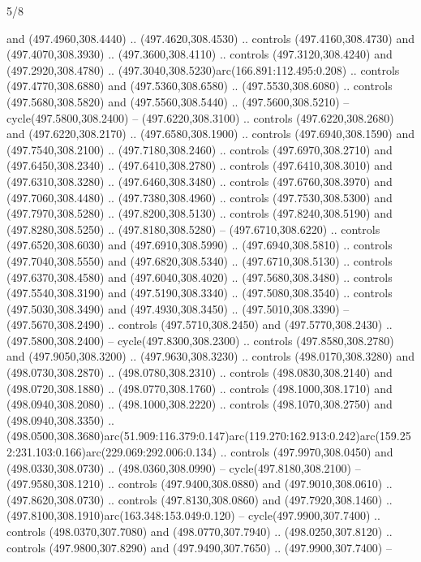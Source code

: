 \begin{flagdescription}{5/8}
\begin{scope}[xshift=0.5\flaglength,yshift=0.5\flagwidth,scale=\flagwidth/475.63]
\begin{scope}[y=0.8pt, x=0.8pt, yscale=-1, xscale=1,shift={(-450,-300)}]
\begin{scope}[cm={{1.0,0.0,0.0,1.0,(-0.0002,0.12556)}},cm={{1.0,0.0,0.0,1.0,(0.00179,0.0)}}]
\begin{scope}[cm={{1.11592,0.0,0.0,1.11592,(-106.89933,-41.77764)}}]
\begin{scope}[draw=black,fill=cfff]
\begin{scope}[fill=black]
  and (497.4960,308.4440) .. (497.4620,308.4530) .. controls (497.4160,308.4730)
  and (497.4070,308.3930) .. (497.3600,308.4110) .. controls (497.3120,308.4240)
  and (497.2920,308.4780) .. (497.3040,308.5230)arc(166.891:112.495:0.208) ..
  controls (497.4770,308.6880) and (497.5360,308.6580) .. (497.5530,308.6080) ..
  controls (497.5680,308.5820) and (497.5560,308.5440) .. (497.5600,308.5210) --
  cycle(497.5800,308.2400) -- (497.6220,308.3100) .. controls
  (497.6220,308.2680) and (497.6220,308.2170) .. (497.6580,308.1900) .. controls
  (497.6940,308.1590) and (497.7540,308.2100) .. (497.7180,308.2460) .. controls
  (497.6970,308.2710) and (497.6450,308.2340) .. (497.6410,308.2780) .. controls
  (497.6410,308.3010) and (497.6310,308.3280) .. (497.6460,308.3480) .. controls
  (497.6760,308.3970) and (497.7060,308.4480) .. (497.7380,308.4960) .. controls
  (497.7530,308.5300) and (497.7970,308.5280) .. (497.8200,308.5130) .. controls
  (497.8240,308.5190) and (497.8280,308.5250) .. (497.8180,308.5280) --
  (497.6710,308.6220) .. controls (497.6520,308.6030) and (497.6910,308.5990) ..
  (497.6940,308.5810) .. controls (497.7040,308.5550) and (497.6820,308.5340) ..
  (497.6710,308.5130) .. controls (497.6370,308.4580) and (497.6040,308.4020) ..
  (497.5680,308.3480) .. controls (497.5540,308.3190) and (497.5190,308.3340) ..
  (497.5080,308.3540) .. controls (497.5030,308.3490) and (497.4930,308.3450) ..
  (497.5010,308.3390) -- (497.5670,308.2490) .. controls (497.5710,308.2450) and
  (497.5770,308.2430) .. (497.5800,308.2400) -- cycle(497.8300,308.2300) ..
  controls (497.8580,308.2780) and (497.9050,308.3200) .. (497.9630,308.3230) ..
  controls (498.0170,308.3280) and (498.0730,308.2870) .. (498.0780,308.2310) ..
  controls (498.0830,308.2140) and (498.0720,308.1880) .. (498.0770,308.1760) ..
  controls (498.1000,308.1710) and (498.0940,308.2080) .. (498.1000,308.2220) ..
  controls (498.1070,308.2750) and (498.0940,308.3350) ..
  (498.0500,308.3680)arc(51.909:116.379:0.147)arc(119.270:162.913:0.242)arc(159.252:231.103:0.166)arc(229.069:292.006:0.134)
  .. controls (497.9970,308.0450) and (498.0330,308.0730) .. (498.0360,308.0990)
  -- cycle(497.8180,308.2100) -- (497.9580,308.1210) .. controls
  (497.9400,308.0880) and (497.9010,308.0610) .. (497.8620,308.0730) .. controls
  (497.8130,308.0860) and (497.7920,308.1460) ..
  (497.8100,308.1910)arc(163.348:153.049:0.120) -- cycle(497.9900,307.7400) ..
  controls (498.0370,307.7080) and (498.0770,307.7940) .. (498.0250,307.8120) ..
  controls (497.9800,307.8290) and (497.9490,307.7650) .. (497.9900,307.7400) --

\end{scope}
\end{scope}
\end{scope}
\end{scope}
\end{scope}
\end{scope}
\end{flagdescription}
